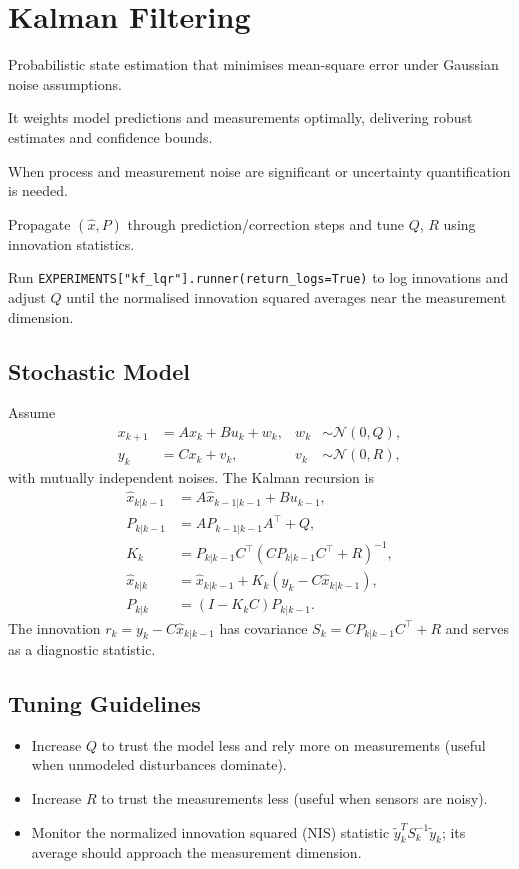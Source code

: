 \section{Kalman Filtering}
\begin{beginnerguide}
    \item[\textbf{What?}] Probabilistic state estimation that minimises mean-square error under Gaussian noise assumptions.
    \item[\textbf{Why?}] It weights model predictions and measurements optimally, delivering robust estimates and confidence bounds.
    \item[\textbf{When?}] When process and measurement noise are significant or uncertainty quantification is needed.
    \item[\textbf{How?}] Propagate $(\hat{x},P)$ through prediction/correction steps and tune $Q$, $R$ using innovation statistics.
    \item[\textbf{Example}] Run \texttt{EXPERIMENTS["kf\_lqr"].runner(return\_logs=True)} to log innovations and adjust $Q$ until the normalised innovation squared averages near the measurement dimension.
\end{beginnerguide}
\subsection{Stochastic Model}
Assume
\begin{align}
    x_{k+1} &= A x_k + B u_k + w_k, & w_k &\sim \mathcal{N}(0, Q), \\
    y_k &= C x_k + v_k, & v_k &\sim \mathcal{N}(0, R),
\end{align}
with mutually independent noises. The Kalman recursion is
\begin{align*}
    \hat{x}_{k|k-1} &= A \hat{x}_{k-1|k-1} + B u_{k-1},\\
    P_{k|k-1} &= A P_{k-1|k-1} A^\top + Q,\\
    K_k &= P_{k|k-1} C^\top (C P_{k|k-1} C^\top + R)^{-1},\\
    \hat{x}_{k|k} &= \hat{x}_{k|k-1} + K_k (y_k - C \hat{x}_{k|k-1}),\\
    P_{k|k} &= (I - K_k C) P_{k|k-1}.
\end{align*}
The innovation $r_k = y_k - C \hat{x}_{k|k-1}$ has covariance $S_k = C P_{k|k-1} C^\top + R$ and serves as a diagnostic statistic.

\subsection{Tuning Guidelines}
\begin{itemize}[leftmargin=*]
    \item Increase $Q$ to trust the model less and rely more on measurements (useful when unmodeled disturbances dominate).
    \item Increase $R$ to trust the measurements less (useful when sensors are noisy).
    \item Monitor the normalized innovation squared (NIS) statistic $\tilde{y}_k^T S_k^{-1} \tilde{y}_k$; its average should approach the measurement dimension.
\end{itemize}

